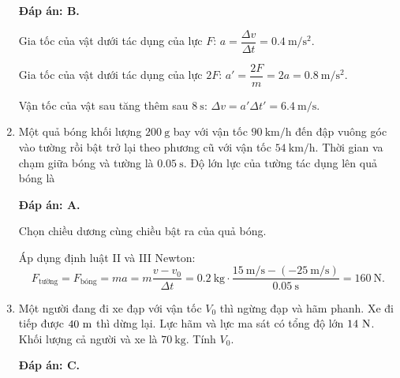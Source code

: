 \begin{enumerate}[label=\bfseries Câu \arabic*:]
	\hideall
	{	\textbf{Đáp án: B.}
		
		Gia tốc của vật dưới tác dụng của lực $F$: $a=\dfrac{\Delta v}{\Delta t}=\SI{0.4}{\meter / \second \squared}$.
		
		Gia tốc của vật dưới tác dụng của lực $2F$: $a'=\dfrac{2F}{m}=2a=\SI{0.8}{\meter / \second \squared}$.
		
		Vận tốc của vật sau tăng thêm sau $\SI{8}{\second}$: $\Delta v= a' \Delta t'=\SI{6.4}{\meter / \second}$.
	}
	\item {}
	
	
	{Một quả bóng khối lượng $\SI{200}{\gram}$ bay với vận tốc $\SI{90}{\kilo\meter/\hour}$ đến đập vuông góc vào tường rồi bật trở lại theo phương cũ với vận tốc $\SI{54}{\kilo\meter/\hour}$. Thời gian va chạm giữa bóng và tường là $\SI{0,05}{\second}$. Độ lớn lực của tường tác dụng lên quả bóng là
	}
	
	\hideall
	{	\textbf{Đáp án: A.}
		
		Chọn chiều dương cùng chiều bật ra của quả bóng.
		
		Áp dụng định luật II và III Newton:
		$$F_\text{tường}=F_\text{bóng}=ma=m\dfrac {v-v_0}{\Delta t}=\SI{0,2}{\kilogram}\cdot\dfrac{\SI{15}{\meter/\second}-(\SI{-25}{\meter/\second})}{\SI{0,05}{\second}}=\SI{160}{\newton}.$$
	}
	
	\item {}
	
	
	{Một người đang đi xe đạp với vận tốc $V_0$ thì ngừng đạp và hãm phanh. Xe đi tiếp được $40\ \text m$ thì dừng lại. Lực hãm và lực ma sát có tổng độ lớn $14\ \text N$. Khối lượng cả người và xe là $70\ \text {kg}$. Tính $V_0$.
	}
	
	\hideall
	{	\textbf{Đáp án: C.}	
		
}
\end{enumerate}
